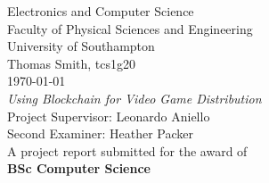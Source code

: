
\thispagestyle{empty}
	
\begin{center}

\vspace{0.2cm}
\Large
Electronics and Computer Science\\
Faculty of Physical Sciences and Engineering\\
University of Southampton\\
\vspace{1cm}
Thomas Smith, tcs1g20\\
\today\\
\vspace{1cm}
\textit{Using Blockchain for Video Game Distribution}\\
\vspace{1cm}
Project Supervisor: Leonardo Aniello\\
Second Examiner: Heather Packer\\
\vspace{1cm}
A project report submitted for the award of\\
\textbf{BSc Computer Science}

\end{center}

\newpage